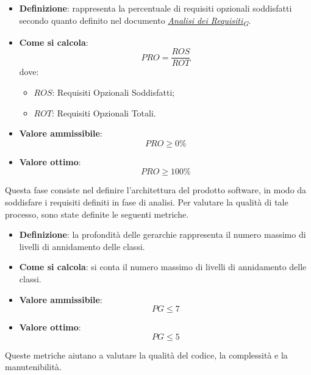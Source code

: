 \begin{itemize}
	\item \textbf{Definizione}: rappresenta la percentuale di requisiti opzionali soddisfatti secondo quanto definito nel documento \href{https://7last.github.io/docs/rtb/documentazione-interna/glossario\#analisi-dei-requisiti}{\textit{Analisi dei Requisiti\textsubscript{G}}}.
	\item \textbf{Come si calcola}: \begin{equation*}PRO = \frac{ROS}{ROT}\end{equation*} dove:
		\begin{itemize}
			\item $ROS$: Requisiti Opzionali Soddisfatti;
			\item $ROT$: Requisiti Opzionali Totali.
		\end{itemize}
	\item \textbf{Valore ammissibile}: \begin{equation*}PRO \geq 0\%\end{equation*}
	\item \textbf{Valore ottimo}: \begin{equation*}PRO \geq 100\%\end{equation*}
\end{itemize}

Questa fase consiste nel definire l'architettura del prodotto software, in modo da soddisfare i requisiti definiti in fase di analisi. Per valutare la qualità di tale processo, sono state definite le seguenti metriche.
\begin{itemize}
	\item \textbf{Definizione}: la profondità delle gerarchie rappresenta il numero massimo di livelli di annidamento delle classi.
	\item \textbf{Come si calcola}: si conta il numero massimo di livelli di annidamento delle classi.
	\item \textbf{Valore ammissibile}: \begin{equation*}PG \leq 7\end{equation*}
	\item \textbf{Valore ottimo}: \begin{equation*}PG \leq 5\end{equation*}
\end{itemize}

Queste metriche aiutano a valutare la qualità del codice, la complessità e la manutenibilità.

